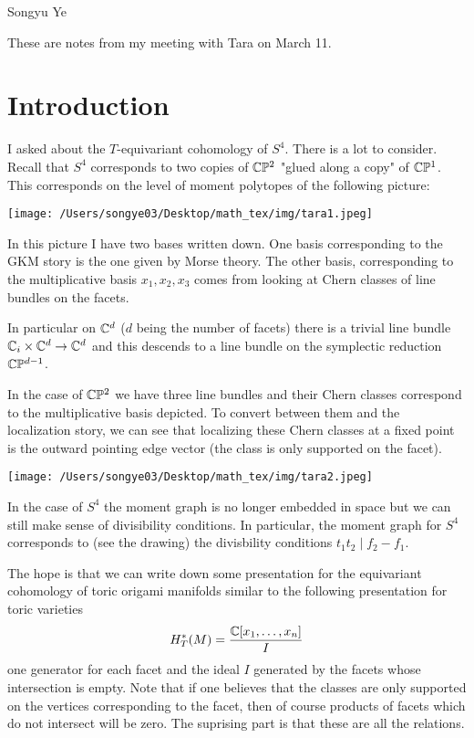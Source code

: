 \documentclass[12pt]{article}
\begin{document}
Songyu Ye

These are notes from my meeting with Tara on March 11.

\section{Introduction}
I asked about the $T$-equivariant cohomology of $S^4$. There is a lot to consider.
Recall that $S^4$ corresponds to two copies of $\mathbb{C}\mathbb{P}^2$ "glued along a copy" of $\mathbb{C}\mathbb{P}^1$.
This corresponds on the level of moment polytopes of the following picture:

\begin{center}
	\texttt{[image: /Users/songye03/Desktop/math\_tex/img/tara1.jpeg]}
\end{center}
In this picture I have two bases written down. One basis corresponding to the GKM story
is the one given by Morse theory. The other basis, corresponding to the multiplicative basis
$x_1,x_2,x_3$ comes from looking at Chern classes of line bundles on the facets.

\hfill

In particular on $\mathbb{C}^d$ ($d$ being the number of facets) there is a trivial line bundle
$\mathbb{C}_i\times \mathbb{C}^d \to \mathbb{C}^d$ and this descends to a line bundle on the symplectic reduction $\mathbb{C}\mathbb{P}^{d-1}$.

\hfill

In the case of $\mathbb{C}\mathbb{P}^2$ we have three line bundles and their Chern classes correspond to the
multiplicative basis depicted. To convert between them and the localization story, we can
see that localizing these Chern classes at a fixed point is the outward pointing edge vector
(the class is only supported on the facet).
\begin{center}
	\texttt{[image: /Users/songye03/Desktop/math\_tex/img/tara2.jpeg]}
\end{center}
In the case of $S^4$ the moment graph is no longer embedded in space but we can still make sense of
divisibility conditions. In particular, the moment graph for $S^4$ corresponds to
(see the drawing) the divisbility conditions $t_1t_2 \mid f_2 - f_1$.

\hfill

The hope is that we can write down some presentation for the equivariant cohomology of toric origami
manifolds similar to the following presentation for toric varieties \begin{align*}
	H_T^*(M) = \frac{\mathbb{C}[x_1,\ldots,x_n]}{I}
\end{align*} one generator for each facet and the ideal $I$ generated by the facets whose
intersection is empty. Note that if one believes that the classes are only supported on the vertices corresponding
to the facet, then of course products of facets which do not intersect will be zero. The suprising
part is that these are all the relations.
\end{document}
